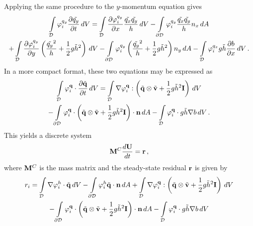 Applying the same procedure to the $y$-momentum equation gives
\begin{multline}
  \int\limits_{\mathcal{D}} \varphi_i^{q_y}\frac{\partial \tilde{q_y}}{\partial t} \,dV
  =
    \int\limits_{\mathcal{D}} \frac{\partial \varphi_i^{q_y}}{\partial x}
      \frac{\tilde{q_x}\tilde{q_y}}{h} \,dV
  - \int\limits_{\partial\mathcal{D}} \varphi_i^{q_y}
      \frac{\tilde{q_x}\tilde{q_y}}{h}n_x \,dA
  \\
  + \int\limits_{\mathcal{D}} \frac{\partial \varphi_i^{q_y}}{\partial y}
      \left(\frac{\tilde{q_y}^2}{h}
      + \frac{1}{2}g\tilde{h}^2\right) \,dV
  - \int\limits_{\partial\mathcal{D}} \varphi_i^{q_y}
      \left(\frac{\tilde{q_y}^2}{h}
      + \frac{1}{2}g\tilde{h}^2\right)n_y \,dA
  - \int\limits_{\mathcal{D}} \varphi_i^{q_x}
      g\tilde{h}\frac{\partial b}{\partial x} \,dV
  \,.
\end{multline}
In a more compact format, these two equations may be expressed as
\begin{multline}
  \int\limits_{\mathcal{D}} \varphi_i^{\mathbf{q}}\cdot\frac{\partial \tilde{\mathbf{q}}}{\partial t} \,dV
  = \int\limits_{\mathcal{D}} \nabla\varphi_i^{\mathbf{q}}:
    \left(\tilde{\mathbf{q}}\otimes\tilde{\mathbf{v}}
    + \frac{1}{2}g\tilde{h}^2\mathbf{I}\right) \,dV
  \\
  - \int\limits_{\partial\mathcal{D}} \varphi_i^{\mathbf{q}}\cdot
    \left(\tilde{\mathbf{q}}\otimes\tilde{\mathbf{v}}
    + \frac{1}{2}g \tilde{h}^2\mathbf{I}\right)\cdot\mathbf{n} \,dA
  - \int\limits_{\mathcal{D}} \varphi_i^{\mathbf{q}}\cdot
    g\tilde{h}\nabla b \,dV
  \,.
\end{multline}
This yields a discrete system
\begin{equation}
  \mathbf{M}^C\frac{d\mathbf{U}}{dt} = \mathbf{r} \,,
\end{equation}
where $\mathbf{M}^C$ is the mass matrix and the steady-state residual
$\mathbf{r}$ is given by
\begin{multline}
  r_i =
  \int\limits_{\mathcal{D}} \nabla\varphi_i^h\cdot\tilde{\mathbf{q}} \,dV
  - \int\limits_{\partial\mathcal{D}} \varphi_i^h\tilde{\mathbf{q}}\cdot\mathbf{n} \,dA
  + \int\limits_{\mathcal{D}} \nabla\varphi_i^{\mathbf{q}}:
    \left(\tilde{\mathbf{q}}\otimes\tilde{\mathbf{v}}
    + \frac{1}{2}g\tilde{h}^2\mathbf{I}\right) \,dV
  \\
  - \int\limits_{\partial\mathcal{D}} \varphi_i^{\mathbf{q}}\cdot
    \left(\tilde{\mathbf{q}}\otimes\tilde{\mathbf{v}}
    + \frac{1}{2}g \tilde{h}^2\mathbf{I}\right)\cdot\mathbf{n} \,dA
  - \int\limits_{\mathcal{D}} \varphi_i^{\mathbf{q}}\cdot
    g\tilde{h}\nabla b \,dV
\end{multline}
